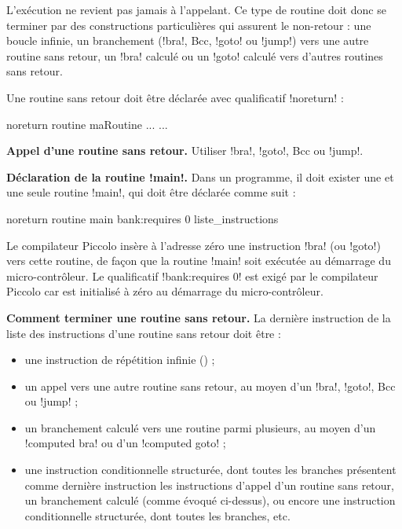 L’exécution ne revient pas jamais à l’appelant. Ce type de routine doit donc se terminer par des constructions particulières qui assurent le non-retour : une boucle infinie, un branchement (\pic!bra!, Bcc, \pic!goto! ou \pic!jump!) vers une autre routine sans retour, un \pic!bra! calculé ou un \pic!goto! calculé vers d’autres routines sans retour.

Une routine sans retour doit être déclarée avec qualificatif \pic!noreturn! :
\begin{piccolo}
noreturn routine maRoutine ... {
  ...
}
\end{piccolo}

\textbf{Appel d’une routine sans retour.} Utiliser \pic!bra!, \pic!goto!, Bcc ou \pic!jump!.


\textbf{Déclaration de la routine \pic!main!.} Dans un programme, il doit exister une et une seule routine \pic!main!, qui doit être déclarée comme suit :

\begin{piccolo}
noreturn routine main bank:requires 0 {
   liste_instructions
}

\end{piccolo}

Le compilateur Piccolo insère à l’adresse zéro une instruction \pic!bra! (ou \pic!goto!) vers cette routine, de façon que la routine \pic!main! soit exécutée au démarrage du micro-contrôleur. Le qualificatif \pic!bank:requires 0! est exigé par le compilateur Piccolo car  est initialisé à zéro au démarrage du micro-contrôleur.


\textbf{Comment terminer une routine sans retour.} La dernière instruction de la liste des instructions d’une routine sans retour doit être :
\begin{itemize}
  \item une instruction de répétition infinie () ;
  \item un appel vers une autre routine sans retour, au moyen d’un \pic!bra!, \pic!goto!, Bcc ou \pic!jump! ;
  \item un branchement calculé vers une routine parmi plusieurs, au moyen d’un \pic!computed bra! ou d’un \pic!computed goto! ;
  \item une instruction conditionnelle structurée, dont toutes les branches présentent comme dernière instruction les instructions d’appel d’un routine sans retour, un branchement calculé (comme évoqué ci-dessus), ou encore une instruction conditionnelle structurée, dont toutes les branches, etc.

\end{itemize}

